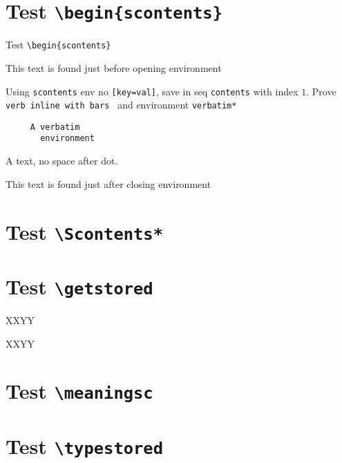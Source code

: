 \documentclass{article}
\begin{document}
\section{Test \texttt{\textbackslash begin\{scontents\}}}
Test \verb+\begin{scontents}+ \par

This text is found just before opening environment 
\begin{scontents}[print-env=true]
Using \verb+scontents+ env no \verb+[key=val]+, save in seq \verb+contents+ 
with index $1$.
Prove \verb*| verb inline with bars | and environment \verb+verbatim*+
\begin{verbatim}
     A verbatim  
       environment
\end{verbatim}
A text, no space after dot.
\end{scontents}This text is found just after closing environment

\section{Test \texttt{\textbackslash Scontents*}}


\section{Test \texttt{\textbackslash getstored}}

XXYY\par
XXYY

\section{Test \texttt{\textbackslash meaningsc}}

\par


\section{Test \texttt{\textbackslash typestored}}


\end{document}
